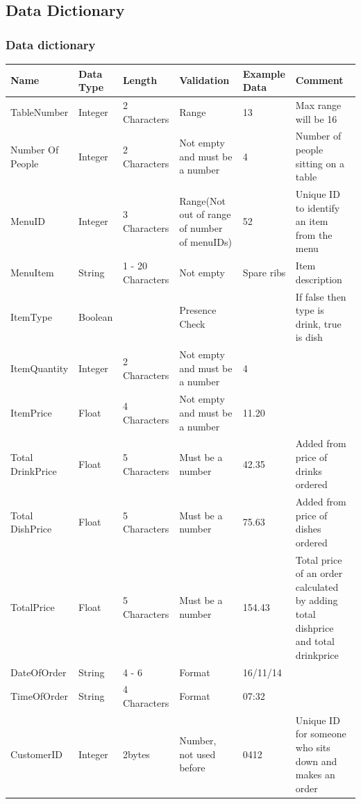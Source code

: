 	
\subsection{Data Dictionary}

\subsubsection{Data dictionary}

\begin{center}

\begin{tabular}{ | p{2cm}| p{1cm} | p{1cm} | p{2cm} | p{1cm} | p{3cm} | }
    \hline
    \textbf{Name} & \textbf{Data Type} & \textbf{Length} & \textbf{Validation} &\textbf{Example Data} & \textbf{Comment} \\ \hline
   TableNumber & Integer & 2 Characters & Range  & 13 & Max range will be 16 \\ \hline
   Number Of People & Integer & 2 Characters& Not empty and must be a number  & 4 & Number of people sitting on a table \\ \hline
  MenuID & Integer & 3 Characters& Range(Not out of range of number of menuIDs) & 52 & Unique ID to identify an item from the menu \\ \hline
   MenuItem & String & 1 - 20 Characters & Not empty  & Spare ribs & Item description\\ \hline
   ItemType&Boolean& &Presence Check & &If false then type is drink, true is dish \\ \hline
   ItemQuantity & Integer & 2 Characters & Not empty and must be a number  & 4 &\\ \hline
   ItemPrice & Float & 4 Characters & Not empty and must be a number  &11.20 &\\ \hline
   Total DrinkPrice & Float & 5 Characters & Must be a number & 42.35 & Added from price of drinks ordered \\ \hline
   Total DishPrice & Float & 5 Characters & Must be a number&  75.63  &  Added from price of dishes ordered \\ \hline
    TotalPrice & Float & 5 Characters & Must be a number & 154.43 & Total price of an order calculated by adding total dishprice and total drinkprice\\ \hline
   DateOfOrder &String & 4 - 6 & Format  & 16/11/14 & \\ \hline
   TimeOfOrder &String & 4 Characters & Format & 07:32 &  \\ \hline
    CustomerID & Integer & 2bytes & Number, not used before& 0412 & Unique ID for someone who sits down and makes an order \\ \hline

\end{tabular}
\end{center}
